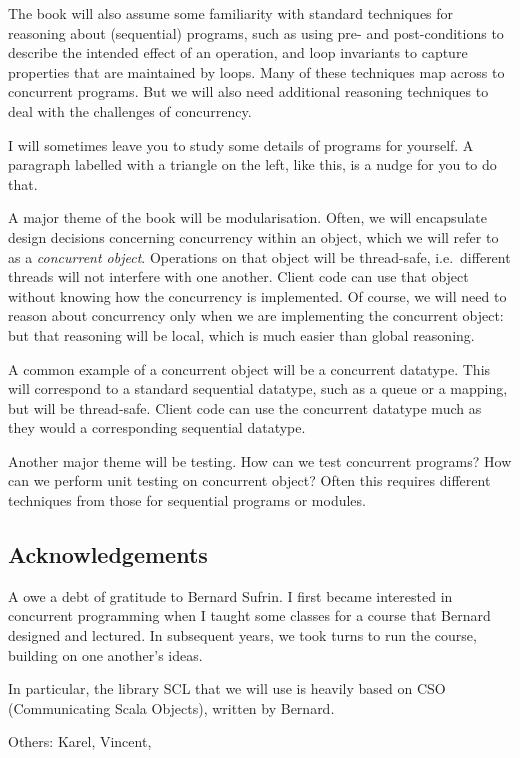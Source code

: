The book will also assume some familiarity with standard techniques for
reasoning about (sequential) programs, such as using pre- and post-conditions
to describe the intended effect of an operation, and loop invariants to
capture properties that are maintained by loops.  Many of these techniques map
across to concurrent programs.  But we will also need additional reasoning
techniques to deal with the challenges of concurrency.

\begin{instruction}
I will sometimes leave you to study some details of programs for yourself.  A
paragraph labelled with a triangle on the left, like this, is a nudge for you
to do that.
\end{instruction}

A major theme of the book will be modularisation.  Often, we will encapsulate
design decisions concerning concurrency within an object, which we will refer
to as a \emph{concurrent object}.  Operations on that object will be
thread-safe, i.e.~different threads will not interfere with one another.
Client code can use that object without knowing how the concurrency is
implemented.  Of course, we will need to reason about concurrency only when we
are implementing the concurrent object: but that reasoning will be local,
which is much easier than global reasoning.

A common example of a concurrent object will be a concurrent datatype.  This
will correspond to a standard sequential datatype, such as a queue or a
mapping, but will be thread-safe.  Client code can use the concurrent datatype
much as they would a corresponding sequential datatype.

Another major theme will be testing.  How can we test concurrent programs?
How can we perform unit testing on concurrent object?  Often this requires
different techniques from those for sequential programs or modules.



\subsection*{Acknowledgements}

A owe a debt of gratitude to Bernard Sufrin.  I first became interested in
concurrent programming when I taught some classes for a course that Bernard
designed and lectured.  In subsequent years, we took turns to run the course,
building on one another's ideas. 

In particular, the library SCL that we will use is heavily based on  CSO
(Communicating Scala Objects), written by Bernard.

Others: Karel, Vincent, \framebox{\ldots}
